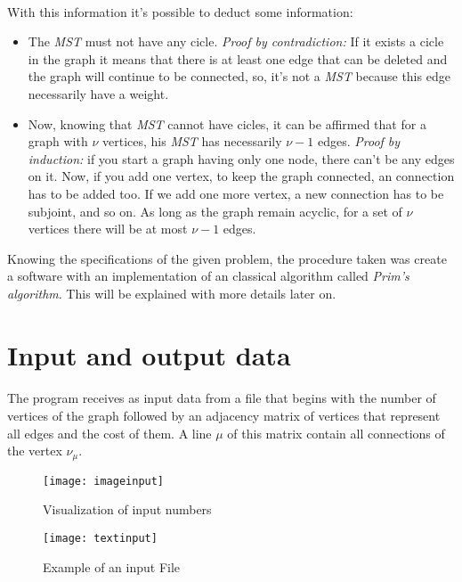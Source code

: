 \documentclass[titlepage]{article}
\begin{document}
    \paragraph{}
        With this information it's possible to deduct some information:
        \begin{itemize}
            \item The \emph{MST} must not have any cicle. \emph{Proof by contradiction:} If it exists a cicle in the graph it means that there is at least one edge that can be deleted and the graph will continue to be connected, so, it's not a \emph{MST} because this edge necessarily have a weight.
            \item  Now, knowing that \emph{MST} cannot have cicles, it can be affirmed that for a graph with \(\nu\) vertices, his \emph{MST} has necessarily \(\nu-1\) edges. \emph{Proof by induction:} if you start a graph having only one node, there can't be any edges on it. Now, if you add one vertex, to keep the graph connected, an connection has to be added too. If we add one more vertex, a new connection has to be subjoint, and so on. As long as the graph remain acyclic, for a set of \(\nu\) vertices there will be at most \(\nu-1\) edges. 
        \end{itemize} 
        Knowing the specifications of the given problem, the procedure taken was create a software with an implementation of an classical algorithm called \emph{Prim's algorithm}. This will be explained with more details later on.
        
    \section{Input and output data}
    \paragraph{}
        The program receives as input data from a file that begins with the number of vertices of the graph followed by an adjacency matrix of vertices that represent all edges and the cost of them. A line $\mu$ of this matrix contain all connections of the vertex $\nu_\mu$.
        \begin{figure}[h]
            \begin{center}
                \texttt{[image: imageinput]}
                \caption{Visualization of input numbers\label{fig:inp2}}
            \end{center}
        \end{figure}
        \begin{figure}[h]
            \begin{center}
                \texttt{[image: textinput]}
                \caption{Example of an input File}
            \end{center}
        \end{figure}
\end{document}
